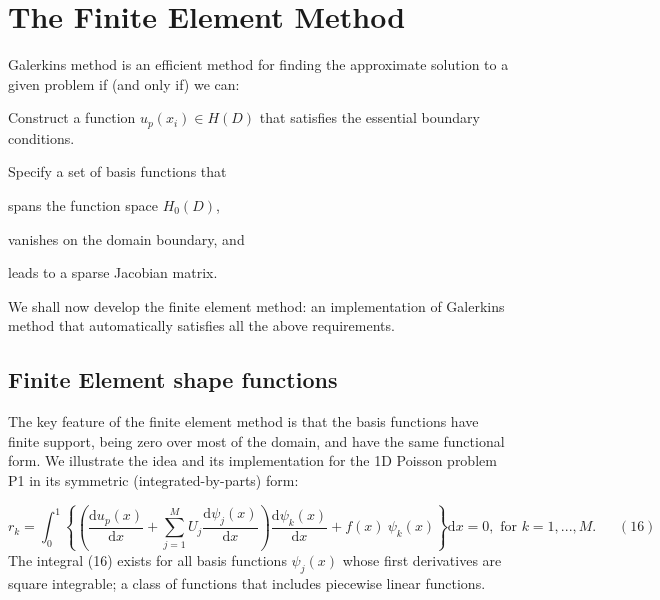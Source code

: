 \hypertarget{index_fe}{}\section{The Finite Element Method}\label{index_fe}
Galerkin\textquotesingle{}s method is an efficient method for finding the approximate solution to a given problem if (and only if) we can\+:
\begin{DoxyEnumerate}
\item Construct a function $ u_p(x_i) \in H(D)$ that satisfies the essential boundary conditions.
\item Specify a set of basis functions that
\begin{DoxyEnumerate}
\item spans the function space $ H_0(D)$,
\item vanishes on the domain boundary, and
\item leads to a sparse Jacobian matrix.
\end{DoxyEnumerate}
\end{DoxyEnumerate}We shall now develop the finite element method\+: an implementation of Galerkin\textquotesingle{}s method that automatically satisfies all the above requirements.



\hypertarget{index_fe_basis_fct}{}\subsection{Finite Element shape functions}\label{index_fe_basis_fct}
The key feature of the finite element method is that the basis functions have finite support, being zero over most of the domain, and have the same functional form. We illustrate the idea and its implementation for the 1D Poisson problem P1 in its symmetric (integrated-\/by-\/parts) form\+:

\[ r_k = \int_0^1 \left\{ \left( \frac{\mbox{d} u_p(x)}{\mbox{d} x} +\sum_{j=1}^{M} U_{j} \frac{\mbox{d} \psi_j(x)}{\mbox{d} x} \right) \frac{\mbox{d} \psi_k(x)}{\mbox{d} x} + f(x) \ \psi_k(x) \right\} \mbox{d}x =0, \mbox{\ \ \ \ \ \ for $k=1,...,M.$}\ \ \ \ \ \ \ (16) \] The integral (16) exists for all basis functions $ \psi_j(x)$ whose first derivatives are square integrable; a class of functions that includes piecewise linear functions.

